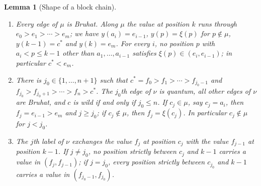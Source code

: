 \documentclass[11pt]{article}
\newtheorem{lemma}[proposition]{Lemma}
\begin{document}
\begin{lemma}[Shape of a block chain]\label{lem:shape}
\begin{enumerate}
\item Every edge of $\mu$ is Bruhat. Along $\mu$ the value at position
 $k$ runs through $e_0>e_1>\cdots>e_m$; we have $y(a_i)=e_{i-1}$,
 $y(p)=\xi(p)$ for $p\notin\mu$, $y(k-1)=c^\ast$ and $y(k)=e_m$. For
 every $i$, no position $p$ with $a_i<p\leq k-1$ other than
 $a_1,\ldots,a_{i-1}$ satisfies $\xi(p)\in(e_i,e_{i-1})$; in particular
 $c^\ast<e_m$.
\item There is $j_0\in\{1,\ldots,n+1\}$ such that
 $c^\ast=f_0>f_1>\cdots>f_{j_0-1}$ and
 $f_{j_0}>f_{j_0+1}>\cdots>f_n>c^\ast$. The $j_0$th edge of $\nu$ is
 quantum, all other edges of $\nu$ are Bruhat, and $c$ is wild if and
 only if $j_0\leq n$. If $c_j\in\mu$, say $c_j=a_i$, then
 $f_j=e_{i-1}>e_m$ and $j\geq j_0$; if $c_j\notin\mu$, then
 $f_j=\xi(c_j)$. In particular $c_j\notin\mu$ for $j<j_0$.
\item The $j$th label of $\nu$ exchanges the value $f_j$ at position
 $c_j$ with the value $f_{j-1}$ at position $k-1$. If $j\neq j_0$, no
 position strictly between $c_j$ and $k-1$ carries a value in
 $(f_j,f_{j-1})$; if $j=j_0$, every position strictly between
 $c_{j_0}$ and $k-1$ carries a value in $(f_{j_0-1},f_{j_0})$.
\end{enumerate}
\end{lemma}
\end{document}
